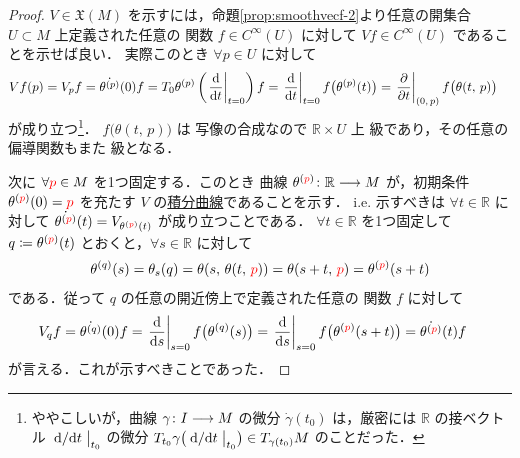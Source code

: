 \documentclass[geometry_main]{subfiles}
\begin{document}
\begin{proof}
    $V \in \mathfrak{X}(M)$ を示すには，命題\ref{prop:smoothvecf-2}より任意の開集合 $U \subset M$ 上定義された任意の \cinfty 関数 $f \in C^\infty (U)$ に対して $V f \in C^\infty (U)$ であることを示せば良い．
    実際このとき $\forall p \in U$ に対して
    \begin{align}
        Vf (p) &= V_p f = \dot{\theta^{(p)}} (0) f 
        = T_0 \theta^{(p)} \left( \eval{\dv{}{t}}_{t=0} \right) f
        = \eval{\dv{}{t}}_{t=0} f \bigl( \theta^{(p)} (t) \bigr) = \eval{\pdv{}{t}}_{(0,\, p)} f \bigl( \theta(t,\, p) \bigr) 
    \end{align}
    が成り立つ\footnote{ややこしいが，\cinfty 曲線 $\gamma \colon I \longrightarrow M$ の微分 $\dot{\gamma} (t_0)$ は，厳密には $\mathbb{R}$ の接ベクトル $\eval{\dv*{}{t}}_{t_0}$ の微分 $T_{t_0} \gamma \bigl( \eval{\dv*{}{t}}_{t_0} \bigr) \in T_{\gamma(t_0)} M$ のことだった．}．
    $f \bigl( \theta(t,\, p) \bigr) $ は \cinfty 写像の合成なので $\mathbb{R} \times U$ 上 \cinfty 級であり，その任意の偏導関数もまた \cinfty 級となる．

    次に $\forall \textcolor{red}{p}\in M$ を1つ固定する．このとき \cinfty 曲線 $\theta^{(\textcolor{red}{p})} \colon \mathbb{R} \longrightarrow M$ が，初期条件 $\theta^{(\textcolor{red}{p})} (0) = \textcolor{red}{p}$ を充たす $V$ の\hyperref[def:integral-curve]{積分曲線}であることを示す．
    i.e. 示すべきは $\forall t \in \mathbb{R}$ に対して $\dot{\theta^{(\textcolor{red}{p})}} (t) = V_{\theta^{(\textcolor{red}{p})}(t)}$ が成り立つことである．
    $\forall t \in \mathbb{R}$ を1つ固定して $q \coloneqq \theta^{(\textcolor{red}{p})} (t)$ とおくと，$\forall s \in \mathbb{R}$ に対して
    \begin{align}
        \theta^{(q)} (s) = \theta_{s}(q) = \theta (s,\, \theta(t,\, \textcolor{red}{p})) = \theta (s + t,\, \textcolor{red}{p}) = \theta^{(\textcolor{red}{p})} (s + t)
    \end{align}
    である．従って $q$ の任意の開近傍上で定義された任意の \cinfty 関数 $f$ に対して
    \begin{align}
        V_q f &= \dot{\theta^{(q)}} (0) f = \eval{\dv{}{s}}_{s=0} f \bigl( \theta^{(q)} (s) \bigr) = \eval{\dv{}{s}}_{s=0} f \bigl( \theta^{(\textcolor{red}{p})} (s + t) \bigr) = \dot{\theta^{(\textcolor{red}{p})}} (t) f
    \end{align}
    が言える．これが示すべきことであった．
\end{proof}
\end{document}
